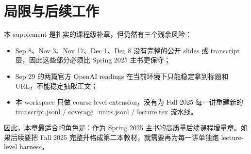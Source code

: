 \section{局限与后续工作}

本 supplement 是扎实的课程级补章，但仍然有三个残余风险：

\begin{itemize}
\item Sep 8、Nov 3、Nov 17、Dec 1、Dec 8 没有完整的公开 slides 或 transcript 层，因此这些部分必须比 Spring 2025 主书更保守；
\item Sep 29 的两篇官方 OpenAI readings 在当前环境下只能稳定拿到标题和 URL，不能稳定抽取正文；
\item 本 workspace 只做 course-level extension，没有为 Fall 2025 每一讲重建新的 transcript.jsonl / coverage\_units.jsonl / lecture.tex 流水线。
\end{itemize}

因此，本章最适合的角色是：作为 Spring 2025 主书的高质量后续课程增量章。如果后续要把 Fall 2025 完整升格成第二本教材，就需要再为每一讲单独跑 lecture-level harness。
